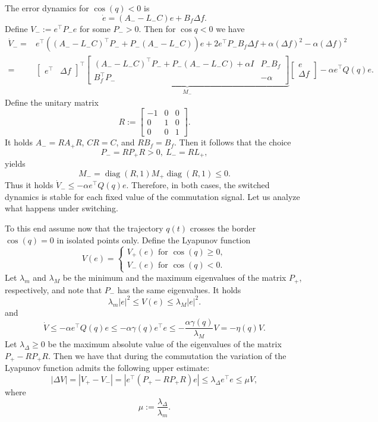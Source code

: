 The error dynamics for $\cos(q)<0$ is
\[
	\dot{e} =  \left(A_- - L_-C\right)e + B_f \Delta f.
\]
Define $V_- := e^\top P_- e$ for some $P_->0$. Then for $\cos{q}< 0$ we have
\[
	\begin{aligned}
		\dot{V}_- =& e^\top\left(\left(A_--L_-C\right)^\top P_- + P_- \left(A_--L_-C\right)\right) e 
		+ 2e^\top P_- B_f \Delta f + \alpha\left(\Delta f\right)^2 - \alpha\left(\Delta f\right)^2 \\
		=& \begin{bmatrix} e^\top & \Delta f \end{bmatrix}^\top
		\underbrace{\begin{bmatrix} \left(A_--L_-C\right)^\top P_- + P_- \left(A_--L_-C\right) + \alpha I & P_-B_f \\
		B_f^\top P_- & -\alpha \end{bmatrix}}_{M_-}
		\begin{bmatrix} e \\ \Delta f \end{bmatrix} - \alpha e^\top Q(q) e.
	\end{aligned}
\]
Define the unitary matrix
\[
	R:=\begin{bmatrix} -1 & 0 & 0 \\  0 & 1 & 0 \\ 0 & 0 & 1 \end{bmatrix}.
\]
It holds $A_- = RA_+R$, $CR=C$, and $RB_f=B_f$. Then it follows that the choice
\[
	P_- = RP_+R>0, \ L_- = RL_+,
\]
yields
\[
	M_- = \operatorname{diag}(R,1)M_+\operatorname{diag}(R,1) \le 0.
\]
Thus it holds $\dot{V}_-\le - \alpha e^\top Q(q) e$. Therefore, in both cases, the switched dynamics is stable for each fixed value of the commutation signal. Let us analyze what happens under switching.

\bigskip

To this end assume now that the trajectory $q(t)$ crosses the border $\cos(q)=0$ in isolated points only. Define the Lyapunov function 
\[
	V(e) = \begin{cases}
		V_+(e) \text{ for } \cos(q) \ge 0, \\
		V_-(e) \text{ for } \cos(q) < 0.
	\end{cases}
\]
Let $\lambda_{m}$ and $\lambda_{M}$ be the minimum and the maximum eigenvalues of the matrix $P_+$, respectively, and note that $P_-$ has the same eigenvalues. It holds
\[
	\lambda_{m} |e|^2 \le V(e) \le \lambda_{M} |e|^2.
\]
and
\[
	\dot{V} \le -\alpha e^\top Q(q) e \le -\alpha \gamma(q)e^\top e \le -\frac{\alpha \gamma(q)}{\lambda_{M}}V = -\eta(q)V.
\]
Let $\lambda_{\Delta}\ge0$ be the  maximum absolute value of the eigenvalues of the matrix $P_+ - RP_+R$. Then we have that during the commutation the variation of the Lyapunov function admits the following upper estimate:
\[
	|\Delta V| = |V_+ - V_-| = |e^\top \left(P_+-RP_+R\right)e| \le \lambda_{\Delta} e^\top e \le \mu V,
\]
where
\[
	\mu:= \frac{\lambda_{\Delta}}{\lambda_{m}}.
\]

